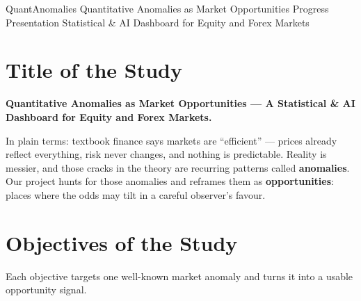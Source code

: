 \documentclass[11pt]{article}
\begin{document}
\thispagestyle{empty}

\titlebanner
  {QuantAnomalies}
  {Quantitative Anomalies as Market Opportunities}
  {Progress Presentation \quad\textbullet\quad Statistical \& AI Dashboard for Equity and Forex Markets}

\vspace{1.2em}

\section{Title of the Study}
\textbf{Quantitative Anomalies as Market Opportunities — A Statistical \& AI
Dashboard for Equity and Forex Markets.}

\begin{opp}
In plain terms: textbook finance says markets are ``efficient'' — prices already
reflect everything, risk never changes, and nothing is predictable. Reality is
messier, and those cracks in the theory are recurring patterns called
\textbf{anomalies}. Our project hunts for those anomalies and reframes them as
\textbf{opportunities}: places where the odds may tilt in a careful observer's favour.
\end{opp}

\section{Objectives of the Study}
Each objective targets one well-known market anomaly and turns it into a usable
opportunity signal.
\end{document}

